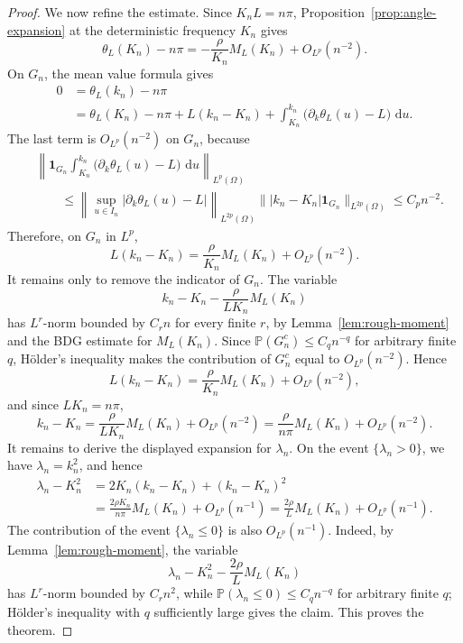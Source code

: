 \documentclass[11pt]{article}
\newcommand{\dd}{\,\mathrm d}
\newcommand{\Prob}{\mathbb P}
\begin{document}
\begin{proof}
We now refine the estimate. Since $K_nL=n\pi$, Proposition~\ref{prop:angle-expansion} at the deterministic frequency $K_n$ gives
\[
    \theta_L(K_n)-n\pi
    =-
    \frac{\rho}{K_n}M_L(K_n)+O_{L^p}(n^{-2}).
\]
On $G_n$, the mean value formula gives
\[
\begin{aligned}
0
&=\theta_L(k_n)-n\pi \\
&=\theta_L(K_n)-n\pi
  +L(k_n-K_n)
  +\int_{K_n}^{k_n}\bigl(\partial_k\theta_L(u)-L\bigr)\,\dd u .
\end{aligned}
\]
The last term is $O_{L^p}(n^{-2})$ on $G_n$, because
\[
\begin{aligned}
&\left\|
    \mathbf 1_{G_n}
    \int_{K_n}^{k_n}\bigl(\partial_k\theta_L(u)-L\bigr)\,\dd u
\right\|_{L^p(\Omega)}  \\
&\qquad\le
\left\|\sup_{u\in I_n}|\partial_k\theta_L(u)-L|\right\|_{L^{2p}(\Omega)}
\bigl\||k_n-K_n|\mathbf 1_{G_n}\bigr\|_{L^{2p}(\Omega)}
\le C_p n^{-2}.
\end{aligned}
\]
Therefore, on $G_n$ in $L^p$,
\[
    L(k_n-K_n)=\frac{\rho}{K_n}M_L(K_n)+O_{L^p}(n^{-2}).
\]
It remains only to remove the indicator of $G_n$. The variable
\[
    k_n-K_n-\frac{\rho}{LK_n}M_L(K_n)
\]
has $L^r$-norm bounded by $C_r n$ for every finite $r$, by Lemma~\ref{lem:rough-moment} and the BDG estimate for $M_L(K_n)$. Since $\Prob(G_n^c)\le C_q n^{-q}$ for arbitrary finite $q$, H\"older's inequality makes the contribution of $G_n^c$ equal to $O_{L^p}(n^{-2})$. Hence
\[
    L(k_n-K_n)=\frac{\rho}{K_n}M_L(K_n)+O_{L^p}(n^{-2}),
\]
and since $LK_n=n\pi$,
\[
    k_n-K_n
    =\frac{\rho}{LK_n}M_L(K_n)+O_{L^p}(n^{-2})
    =\frac{\rho}{n\pi}M_L(K_n)+O_{L^p}(n^{-2}).
\]
It remains to derive the displayed expansion for \(\lambda_n\). On the event \(\{\lambda_n>0\}\), we have \(\lambda_n=k_n^2\), and hence
\[
\begin{aligned}
    \lambda_n-K_n^2
    &=2K_n(k_n-K_n)+(k_n-K_n)^2  \\
    &=\frac{2\rho K_n}{n\pi}M_L(K_n)+O_{L^p}(n^{-1})
     =\frac{2\rho}{L}M_L(K_n)+O_{L^p}(n^{-1}).
\end{aligned}
\]
The contribution of the event \(\{\lambda_n\le0\}\) is also \(O_{L^p}(n^{-1})\). Indeed, by Lemma~\ref{lem:rough-moment}, the variable
\[
    \lambda_n-K_n^2-\frac{2\rho}{L}M_L(K_n)
\]
has \(L^r\)-norm bounded by \(C_rn^2\), while \(\Prob(\lambda_n\le0)\le C_qn^{-q}\) for arbitrary finite \(q\); H\"older's inequality with \(q\) sufficiently large gives the claim.
This proves the theorem.
\end{proof}
\end{document}
